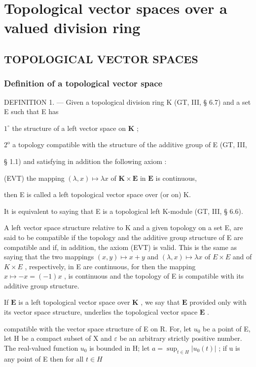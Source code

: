 \chapter{Topological vector spaces over a valued division ring}

\section{TOPOLOGICAL VECTOR SPACES}

\subsection{Definition of a topological vector space}

DEFINITION 1. --- Given a topological division ring K (GT, III, § 6.7) and a set E such that E has

\(1^{\circ}\) the structure of a left vector space on \(\mathbf{K}\) ;

\(2^{\mathrm{o}}\) a topology compatible with the structure of the additive group of E (GT, III,

§ 1.1) and satisfying in addition the following axiom :

(EVT) the mapping \((\lambda, x) \mapsto \lambda x\) of \(\mathbf{K} \times \mathbf{E}\) in \(\mathbf{E}\) is continuous,

then E is called a left topological vector space over (or on) K.

It is equivalent to saying that E is a topological left K-module (GT, III, § 6.6).

A left vector space structure relative to K and a given topology on a set E, are said to be compatible if the topology and the additive group structure of E are compatible and if, in addition, the axiom (EVT) is valid. This is the same as saying that the two mappings \((x, y) \mapsto x + y\) and \((\lambda, x) \mapsto \lambda x\) of \(E \times E\) and of \(K \times E\) , respectively, in E are continuous, for then the mapping \(x \mapsto -x = (-1)x\) , is continuous and the topology of E is compatible with its additive group structure.

If \(\mathbf{E}\) is a left topological vector space over \(\mathbf{K}\) , we say that \(\mathbf{E}\) provided only with its vector space structure, underlies the topological vector space \(\mathbf{E}\) .

compatible with the vector space structure of E on R. For, let \(u_{0}\) be a point of E, let H be a compact subset of X and \(\varepsilon\) be an arbitrary strictly positive number. The real-valued function \(u_{0}\) is bounded in H; let \(a = \sup_{t \in H} |u_{0}(t)|\) ; if u is any point of E then for all \(t \in H\)

